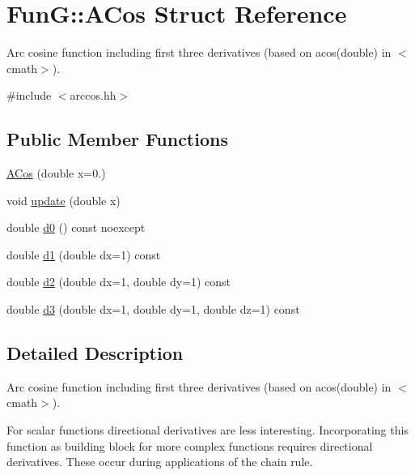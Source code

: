 \hypertarget{structFunG_1_1ACos}{\section{\-Fun\-G\-:\-:\-A\-Cos \-Struct \-Reference}
\label{structFunG_1_1ACos}
}


\-Arc cosine function including first three derivatives (based on acos(double) in $<$cmath$>$).  




{\ttfamily \#include $<$arccos.\-hh$>$}

\subsection*{\-Public \-Member \-Functions}
\begin{DoxyCompactItemize}
\item 
\hyperlink{structFunG_1_1ACos_a8096fe8fa93bb01b8fe3c1111aff300f}{\-A\-Cos} (double x=0.)
\item 
void \hyperlink{structFunG_1_1ACos_ad3870e46f4078161a3d586a44abc0c9c}{update} (double x)
\item 
double \hyperlink{structFunG_1_1ACos_abba20909d43d66485798fa56cf12d929}{d0} () const noexcept
\item 
double \hyperlink{structFunG_1_1ACos_ad88d0c101e91f6183e16232614fb3471}{d1} (double dx=1) const 
\item 
double \hyperlink{structFunG_1_1ACos_a37917f9283d6b8414839283de92ab33f}{d2} (double dx=1, double dy=1) const 
\item 
double \hyperlink{structFunG_1_1ACos_a5666e7232f2cf5c9257b34c6f165f477}{d3} (double dx=1, double dy=1, double dz=1) const 
\end{DoxyCompactItemize}


\subsection{\-Detailed \-Description}
\-Arc cosine function including first three derivatives (based on acos(double) in $<$cmath$>$). 

\-For scalar functions directional derivatives are less interesting. \-Incorporating this function as building block for more complex functions requires directional derivatives. \-These occur during applications of the chain rule. 

